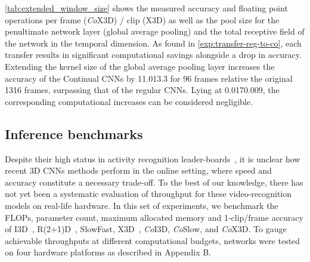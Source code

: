 \documentclass[runningheads]{llncs}
\begin{document}
\cref{tab:extended_window_size} shows the measured accuracy and floating point operations per frame (\textit{Co}X3D) / clip (X3D) as well as the pool size for the penultimate network layer (global average pooling) and the total receptive field of the network in the temporal dimension. 
As found in \cref{exp:transfer-reg-to-co}, each transfer results in significant computational savings alongside a drop in accuracy.
Extending the kernel size of the global average pooling layer increases the accuracy of the Continual CNNs by 11.013.3 for 96 frames relative the original 1316 frames, surpassing that of the regular CNNs.
Lying at 0.0170.009, the corresponding computational increases can be considered negligible. 













\subsection{Inference benchmarks} \label{sec:inference-benchmarks}
Despite their high status in activity recognition leader-boards~\cite{paperswithcode2021kinetics400},
it is unclear how recent 3D CNNs methods perform in the online setting, where speed and accuracy constitute a necessary trade-off.
To the best of our knowledge, there has not yet been a systematic evaluation of throughput for these video-recognition models on real-life hardware.
In this set of experiments, we benchmark the FLOPs, parameter count, maximum allocated memory and 1-clip/frame accuracy of I3D~\cite{carreira2017quo}, R(2+1)D~\cite{tran2018closer}, SlowFast\cite{sovrasov2020ptflops}, X3D~\cite{feichtenhofer2020x3d}, \textit{Co}I3D, \textit{Co}Slow, and \textit{Co}X3D.
To gauge achievable throughputs at different computational budgets, networks were tested on four hardware platforms as described in Appendix B.
\end{document}
